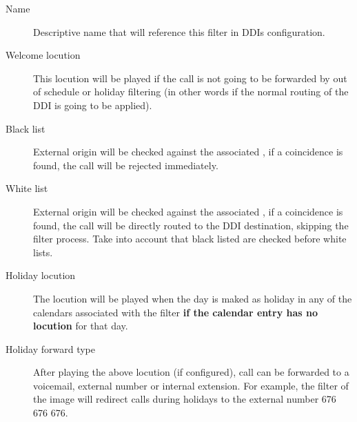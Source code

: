 \documentclass[letterpaper,10pt,english]{sphinxmanual}
\begin{document}
\noindent{}
\begin{description}
\item[{Name}] \leavevmode{}\label{company/external_filters:term-name}
Descriptive name that will reference this filter in DDIs configuration.

\item[{Welcome locution}] \leavevmode{}\label{company/external_filters:term-welcome-locution}
This locution will be played if the call is not going to be
forwarded by out of schedule or holiday filtering (in other words if
the normal routing of the DDI is going to be applied).

\item[{Black list}] \leavevmode{}\label{company/external_filters:term-black-list}
External origin will be checked against the associated {\hyperref[company/match_lists:match\string-lists]{}},
if a coincidence is found, the call will be rejected immediately.

\item[{White list}] \leavevmode{}\label{company/external_filters:term-white-list}
External origin will be checked against the associated {\hyperref[company/match_lists:match\string-lists]{}},
if a coincidence is found, the call will be directly routed to the DDI
destination, skipping the filter process. Take into account that black
listed are checked before white lists.

\item[{Holiday locution}] \leavevmode{}\label{company/external_filters:term-holiday-locution}
The locution will be  played when the day is maked as holiday in any
of the calendars associated with the filter \textbf{if the calendar entry has
no locution} for that day.

\item[{Holiday forward type}] \leavevmode{}\label{company/external_filters:term-holiday-forward-type}
After playing the above locution (if configured), call can be forwarded
to a voicemail, external number or internal extension. For example, the
filter of the image will redirect calls during holidays to the external
number 676 676 676.


\end{description}
\end{document}
